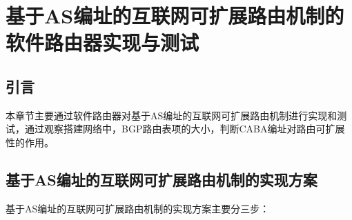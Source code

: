 

\chapter{基于AS编址的互联网可扩展路由机制的软件路由器实现与测试}
\section{引言}
本章节主要通过软件路由器对基于AS编址的互联网可扩展路由机制进行实现和测试，通过观察搭建网络中，BGP路由表项的大小，判断CABA编址对路由可扩展性的作用。
\section{基于AS编址的互联网可扩展路由机制的实现方案}
基于AS编址的互联网可扩展路由机制的实现方案主要分三步：
